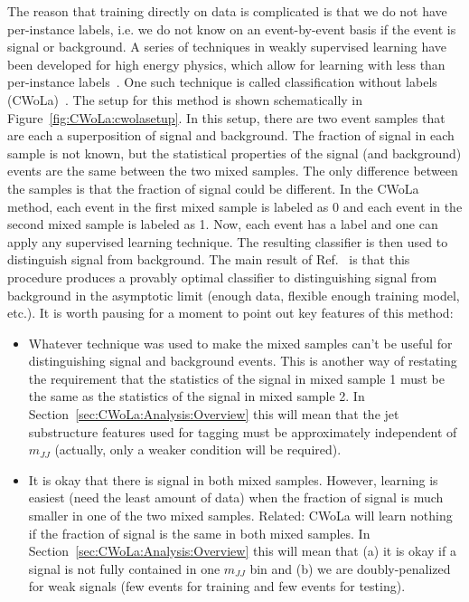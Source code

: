 The reason that training directly on data is complicated is that we do not have per-instance labels, i.e. we do not know on an event-by-event basis if the event is signal or background.  A series of techniques in weakly supervised learning have been developed for high energy physics, which allow for learning with less than per-instance labels~\cite{Metodiev:2017vrx,Dery:2017fap,Cohen:2017exh,Komiske:2018oaa}.  One such technique is called classification without labels (CWoLa)~\cite{Metodiev:2017vrx}.  The setup for this method is shown schematically in Figure~\ref{fig:CWoLa:cwolasetup}.  In this setup, there are two event samples that are each a superposition of signal and background.  The fraction of signal in each sample is not known, but the statistical properties of the signal (and background) events are the same between the two mixed samples.  The only difference between the samples is that the fraction of signal could be different.  In the CWoLa method, each event in the first mixed sample is labeled as 0 and each event in the second mixed sample is labeled as 1.  Now, each event has a label and one can apply any supervised learning technique.  The resulting classifier is then used to distinguish signal from background.  The main result of Ref.~\cite{Metodiev:2017vrx} is that this procedure produces a provably optimal classifier to distinguishing signal from background in the asymptotic limit (enough data, flexible enough training model, etc.).  It is worth pausing for a moment to point out key features of this method:

\begin{itemize}
\item Whatever technique was used to make the mixed samples can't be useful for distinguishing signal and background events.
  This is another way of restating the requirement that the statistics of the signal in mixed sample 1 must be the same as the statistics of the signal in mixed sample 2.
  {\color{white!70!black}In Section~\ref{sec:CWoLa:Analysis:Overview} this will mean that the jet substructure features used for tagging must be approximately independent of $m_{JJ}$ (actually, only a weaker condition will be required).}
\item It is okay that there is signal in both mixed samples.  However, learning is easiest (need the least amount of data) when the fraction of signal is much smaller in one of the two mixed samples.  Related: CWoLa will learn nothing if the fraction of signal is the same in both mixed samples.   {\color{white!70!black}In Section~\ref{sec:CWoLa:Analysis:Overview} this will mean that (a) it is okay if a signal is not fully contained in one $m_{JJ}$ bin and (b) we are doubly-penalized for weak signals (few events for training and few events for testing).}
\end{itemize}

